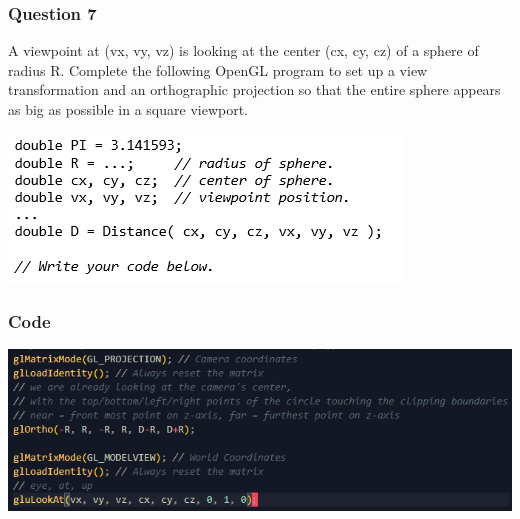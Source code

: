 \documentclass{beamer}
\begin{document}
\begin{frame}
    \frametitle{Question 7}
    A viewpoint at (vx, vy, vz) is looking at the center (cx, cy, cz) 
    of a sphere of radius R. Complete the following OpenGL program to 
    set up a view transformation and an orthographic projection 
    so that the entire sphere appears as big as possible in a 
    square viewport.

    \vspace{1em}

    \includegraphics[]{q7-qn.png}
    

\end{frame}

\begin{frame}
    \frametitle{Code}
    
    \begin{center}
        \includegraphics[scale=0.8]{q7-ans.png}
    \end{center}

\end{frame}
\end{document}
